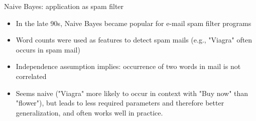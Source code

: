 \documentclass[11pt,compress,t,notes=noshow, xcolor=table]{beamer}
\begin{document}





\begin{vbframe}{Naive Bayes: application as spam filter}
\begin{itemize}
  \item In the late 90s, Naive Bayes became popular for e-mail spam filter programs
  \item Word counts were used as features to detect spam mails (e.g., "Viagra" often occurs in spam mail)
  \item Independence assumption implies: occurrence of two words in mail is not correlated
  \item Seems naive ("Viagra" more likely to occur in context with "Buy now" than "flower"), but leads to less required parameters and therefore better generalization, and often works well in practice.
\end{itemize}
\end{vbframe}


\endlecture
\end{document}
